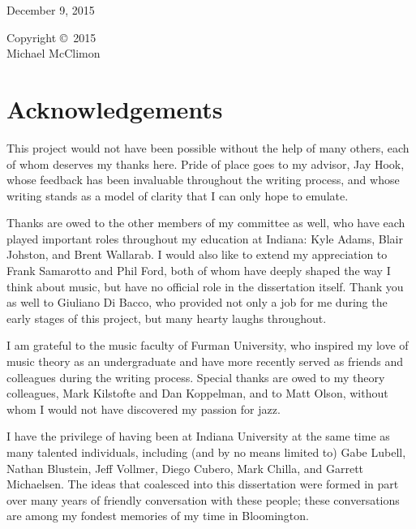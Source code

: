 {\flushleft
December 9, 2015
}

\cleardoublepage

\begin{center}
  \vspace*{\fill}
  Copyright \copyright\ 2015 \\
  Michael McClimon
  \vspace*{\fill}
\end{center}
\cleardoublepage


\section*{\Large Acknowledgements}

\doublespacing

This project would not have been possible without the help of many others,
each of whom deserves my thanks here. Pride of place goes to my advisor, Jay
Hook, whose feedback has been invaluable throughout the writing process, and
whose writing stands as a model of clarity that I can only hope to emulate.

Thanks are owed to the other members of my committee as well, who have each
played important roles throughout my education at Indiana: Kyle Adams,
Blair Johston, and Brent Wallarab. I would also like to extend my
appreciation to Frank Samarotto and Phil Ford, both of whom have deeply shaped
the way I think about music, but have no official role in the dissertation
itself. Thank you as well to Giuliano Di Bacco, who provided not only a job
for me during the early stages of this project, but many hearty laughs throughout.

I am grateful to the music faculty of Furman University, who inspired my love
of music theory as an undergraduate and have more recently served as friends
and colleagues during the writing process. Special thanks are owed to my
theory colleagues, Mark Kilstofte and Dan Koppelman, and to Matt Olson,
without whom I would not have discovered my passion for jazz.

I have the privilege of having been at Indiana University at the same time as
many talented individuals, including (and by no means limited to) Gabe Lubell,
Nathan Blustein, Jeff Vollmer, Diego Cubero, Mark Chilla, and Garrett
Michaelsen. The ideas that coalesced into this dissertation were formed in
part over many years of friendly conversation with these people; these
conversations are among my fondest memories of my time in Bloomington.


